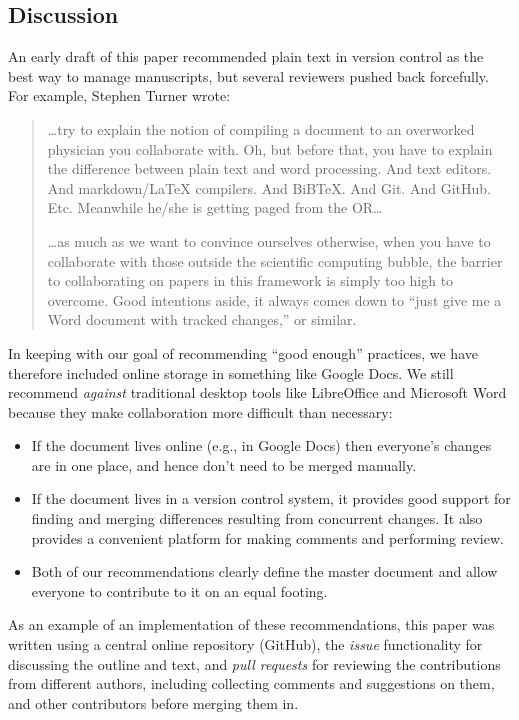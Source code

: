\documentclass[10pt]{article}
\begin{document}
\subsection*{Discussion}

An early draft of this paper recommended plain text in version control
as the best way to manage manuscripts, but several reviewers pushed back
forcefully. For example, Stephen Turner wrote:

\begin{quote}
{\ldots}try to explain the notion of compiling a document to an
overworked physician you collaborate with. Oh, but before that, you have
to explain the difference between plain text and word processing. And
text editors. And markdown/LaTeX compilers. And BiBTeX. And Git. And
GitHub. Etc. Meanwhile he/she is getting paged from the OR{\ldots}

{\ldots}as much as we want to convince ourselves otherwise, when you
have to collaborate with those outside the scientific computing bubble,
the barrier to collaborating on papers in this framework is simply too
high to overcome. Good intentions aside, it always comes down to ``just
give me a Word document with tracked changes,'' or similar.
\end{quote}

In keeping with our goal of recommending ``good enough'' practices, we
have therefore included online storage in something like Google Docs. We
still recommend \emph{against} traditional desktop tools like
LibreOffice and Microsoft Word because they make collaboration more
difficult than necessary:

\begin{itemize}
\item
  If the document lives online (e.g., in Google Docs) then everyone's
  changes are in one place, and hence don't need to be merged manually.
\item
  If the document lives in a version control system, it provides good
  support for finding and merging differences resulting from concurrent
  changes. It also provides a convenient platform for making comments
  and performing review.
\item
  Both of our recommendations clearly define the master document and
  allow everyone to contribute to it on an equal footing.
\end{itemize}

As an example of an implementation of these recommendations, this paper
was written using a central online repository (GitHub), the \emph{issue}
functionality for discussing the outline and text, and \emph{pull
requests} for reviewing the contributions from different authors,
including collecting comments and suggestions on them, and other
contributors before merging them in.
\end{document}
